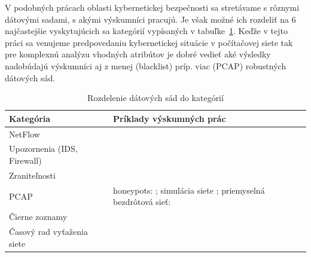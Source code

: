\documentclass[thesismargins, thesislinespacing, openright, upjsfrontpage, combineabstracts]{rnthesis}
\begin{document}

V podobných prácach oblasti kybernetickej bezpečnosti sa stretávame s rôznymi dátovými sadami, s akými výskumníci pracujú. Je však možné ich rozdeliť na 6 najčastejšie vyskytujúcich sa kategórií vypísaných v tabuľke~\ref{tab:c1_datasets}. Keďže v tejto práci sa venujeme predpovedaniu kybernetickej situácie v počítačovej siete tak pre komplexnú analýzu vhodných atribútov je dobré vedieť aké výsledky nadobúdajú výskumníci aj z menej (blacklist) príp. viac (PCAP) robustných dátových sád.

\begin{table}[]
    \centering
    \begin{tabular}{ | p{5cm} | p{9cm} | }
         \hline \textbf{Kategória} & \textbf{Príklady výskumných prác} \\
         \hline
         \hline NetFlow & \cite{zang2019adaptive,fang2019deep,millar2019using,bakhshi2015user,jakalan2015profiling,marchette1999statistical,bernaille2006traffic,jirsik2020cyber} \\
         \hline Upozornenia \newline (IDS, Firewall) & \cite{granat2019big,werner2017time,shin2013advanced,ramaki2015real,soldo2011blacklisting} \\
         \hline Zraniteľnosti & \cite{tang2016exploiting,condon2008analysis,roumani2015time,tang2018disclosure,tang2017big,pokhrel2017cybersecurity} \\
         \hline PCAP & honeypots: \cite{zhan2015predicting,berti2017profiling,hammerschmidt2016efficient}; \newline simulácia siete \cite{jiang2004detecting}; \newline priemyselná bezdrôtová sieť: \cite{wei2012intrusion}  \\
         \hline Čierne zoznamy & \cite{liu2015cloudy} \\
         \hline Časový rad vyťaženia siete & \cite{cortez2012multi,hasegawa2001applications,papagiannaki2005long,sang2002predictability,wang2008internet} \\
         \hline
    \end{tabular}
    \caption{Rozdelenie dátových sád do kategórií}
    \label{tab:c1_datasets}
\end{table}
\end{document}
